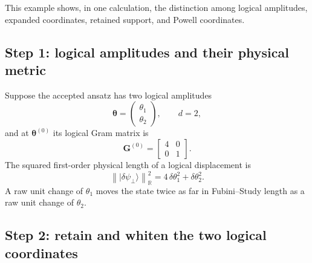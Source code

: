 \documentclass[11pt]{article}
\newcommand{\ket}[1]{\lvert #1\rangle}
\newcommand{\R}{\mathbb R}
\begin{document}
This example shows, in one calculation, the distinction among logical
amplitudes, expanded coordinates, retained support, and Powell coordinates.

\subsection*{Step 1: logical amplitudes and their physical metric}

Suppose the accepted ansatz has two logical amplitudes
\[
\boldsymbol\theta
=
\begin{pmatrix}\theta_1\\\theta_2\end{pmatrix},
\qquad d=2,
\]
and at \(\boldsymbol\theta^{(0)}\) its logical Gram matrix is
\begin{equation}
\mathbf G^{(0)}
=
\begin{bmatrix}
4&0\\
0&1
\end{bmatrix}.
\label{eq:example-logical-gram}
\end{equation}
The squared first-order physical length of a logical displacement is
\begin{equation}
\left\|\ket{\delta\psi_\perp}\right\|_{\R}^{2}
=
4\,\delta\theta_1^2+\delta\theta_2^2.
\label{eq:example-logical-length}
\end{equation}
A raw unit change of \(\theta_1\) moves the state twice as far in
Fubini--Study length as a raw unit change of \(\theta_2\).

\subsection*{Step 2: retain and whiten the two logical coordinates}
\end{document}
